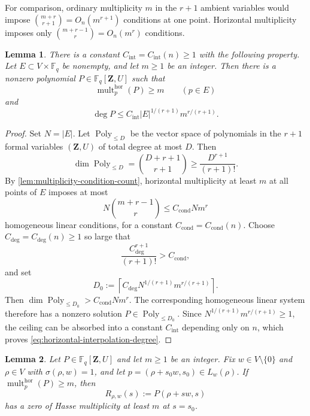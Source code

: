 \documentclass[11pt,letterpaper]{amsart}
\numberwithin{equation}{section}
\newtheorem{lemma}[lemma]{Lemma}
\theoremstyle{definition}
\theoremstyle{remark}
\newcommand{\Fq}{\mathbb F_q}
\begin{document}
For comparison, ordinary multiplicity $m$ in the $r+1$ ambient variables
would impose $\binom{m+r}{r+1}=O_n(m^{r+1})$ conditions at one point.
Horizontal multiplicity imposes only $\binom{m+r-1}{r}=O_n(m^r)$ conditions.

\begin{lemma}
\label{lem:horizontal-interpolation}
There is a constant $C_{\mathrm{int}}=C_{\mathrm{int}}(n)\geq1$ with
the following property. Let $E\subset V\times\Fq$ be nonempty, and let $m\geq1$ be an integer. Then there is a nonzero polynomial
$P\in\Fq[\mathbf Z,U]$ such that
\[
 \operatorname{mult}^{\mathrm{hor}}_p(P)\geq m
 \qquad(p\in E)
\]
and
\begin{equation}\label{eq:horizontal-interpolation-degree}
 \deg P
 \leq
 C_{\mathrm{int}}|E|^{1/(r+1)}m^{r/(r+1)}.
\end{equation}
\end{lemma}

\begin{proof}
Set $N=|E|$.
Let $\operatorname{Poly}_{\leq D}$ be the vector space of polynomials in the
$r+1$ formal variables $(\mathbf Z,U)$ of total degree at most $D$.  Then
\[
 \dim\operatorname{Poly}_{\leq D}
 =
 \binom{D+r+1}{r+1}
 \geq
 \frac{D^{r+1}}{(r+1)!}.
\]
By \cref{lem:multiplicity-condition-count}, horizontal multiplicity at least $m$ at all points of $E$ imposes at most
\[
 N\binom{m+r-1}{r}
 \leq C_{\mathrm{cond}}Nm^r
\]
homogeneous linear conditions, for a constant
$C_{\mathrm{cond}}=C_{\mathrm{cond}}(n)$. Choose
$C_{\mathrm{deg}}=C_{\mathrm{deg}}(n)\geq1$ so large that
\[
 \frac{C_{\mathrm{deg}}^{r+1}}{(r+1)!}>C_{\mathrm{cond}},
\]
and set
\[
 D_0
 :=
 \left\lceil C_{\mathrm{deg}}N^{1/(r+1)}m^{r/(r+1)}\right\rceil.
\]
Then $\dim\operatorname{Poly}_{\leq D_0}>C_{\mathrm{cond}}Nm^r$.
The corresponding homogeneous linear system therefore has a nonzero solution $P\in\operatorname{Poly}_{\leq D_0}$. Since
$N^{1/(r+1)}m^{r/(r+1)}\geq1$, the ceiling can be absorbed into a constant $C_{\mathrm{int}}$ depending only on $n$, which proves
\eqref{eq:horizontal-interpolation-degree}.
\end{proof}


\begin{lemma}
\label{lem:line-multiplicity}
Let $P\in\Fq[\mathbf Z,U]$ and let $m\geq1$ be an integer.  Fix
$w\in V\setminus\{0\}$ and $\rho\in V$ with $\sigma(\rho,w)=1$, and let
$p=(\rho+s_0w,s_0)\in L_w(\rho)$.  If
$\operatorname{mult}^{\mathrm{hor}}_p(P)\geq m$, then
\[
 R_{\rho,w}(s):=P(\rho+sw,s)
\]
has a zero of Hasse multiplicity at least $m$ at $s=s_0$.
\end{lemma}
\end{document}
